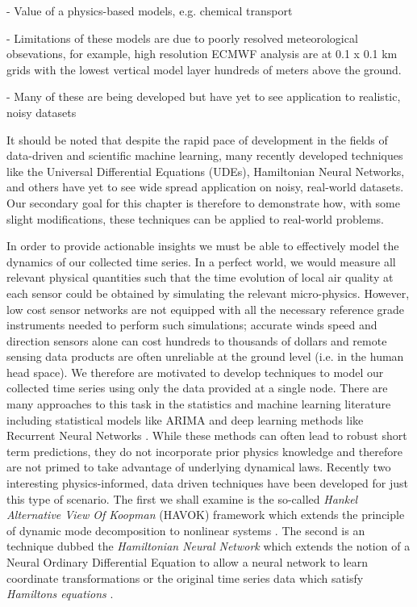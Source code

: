 - Value of a physics-based models, e.g. chemical transport

- Limitations of these models are due to poorly resolved meteorological
obsevations, for example, high resolution ECMWF analysis are at 0.1 x 0.1 km
grids with the lowest vertical model layer hundreds of meters above the ground.

- Many of these are being developed but have yet to see application to
realistic, noisy datasets




It should be noted that
despite the rapid pace of development in the fields of data-driven and
scientific machine learning, many recently developed techniques like the
Universal Differential Equations (UDEs), Hamiltonian Neural Networks, and others
have yet to see wide spread application on noisy, real-world datasets. Our
secondary goal for this chapter is therefore to demonstrate how, with some
slight modifications, these techniques can be applied to real-world problems.


In order to provide actionable insights we must be able to effectively model the
dynamics of our collected time series. In a perfect world, we would measure all
relevant physical quantities such that the time evolution of local air quality
at each sensor could be obtained by simulating the relevant micro-physics.
However, low cost sensor networks are not equipped with all the necessary
reference grade instruments needed to perform such simulations; accurate winds
speed and direction sensors alone can cost hundreds to thousands of dollars and
remote sensing data products are often unreliable at the ground level (i.e. in
the human head space). We therefore are motivated to develop techniques to model
our collected time series using only the data provided at a single node. There
are many approaches to this task in the statistics and machine learning
literature including statistical models like ARIMA and deep learning methods
like Recurrent Neural Networks \cite{intro-to-time-series-models,
  time-series-rnns}. While these methods can often lead to robust short term
predictions, they do not incorporate prior physics knowledge and therefore are
not primed to take advantage of underlying dynamical laws. Recently two
interesting physics-informed, data driven techniques have been developed for
just this type of scenario. The first we shall examine is the so-called
\textit{Hankel Alternative View Of Koopman} (HAVOK) framework which extends the
principle of dynamic mode decomposition to nonlinear systems
\cite{brunton-havok}. The second is an technique dubbed the \textit{Hamiltonian
  Neural Network} which extends the notion of a Neural Ordinary Differential
Equation to allow a neural network to learn coordinate transformations or the
original time series data which satisfy \textit{Hamiltons equations}
\cite{greydanus-hnn}.





